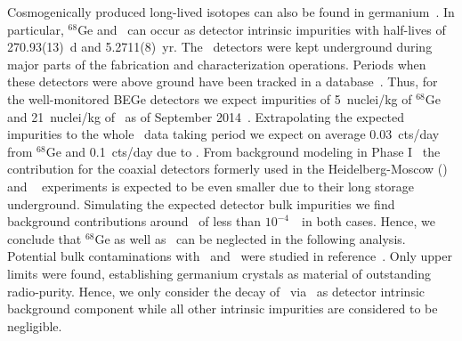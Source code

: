 Cosmogenically produced long-lived isotopes can also be found in
germanium~\cite{Meierhofer2009, Meierhofer2010, Meierhofer2012}. In particular, $^{68}$Ge
and \Co\ can occur as detector intrinsic impurities with half-lives of 270.93(13)~d and
5.2711(8)~yr.  The \bege\ detectors were kept underground during major parts of the
fabrication and characterization operations. Periods when these detectors were above
ground have been tracked in a database~\cite{Agostini2015e}.  Thus, for the well-monitored
BEGe detectors we expect impurities of 5~nuclei/kg of $^{68}$Ge and 21~nuclei/kg of \Co\
as of September 2014~\cite{Agostini2015e}. Extrapolating the expected impurities to the
whole \phasetwo\ data taking period we expect on average 0.03~cts/day from $^{68}$Ge and
0.1~cts/day due to \Co. From background modeling in Phase I~\cite{Agostini2013a} the
contribution for the coaxial detectors formerly used in the Heidelberg-Moscow
(\hdm)~\cite{Klapdor2001} and \igex~\cite{Aalseth2002} experiments is expected to be even
smaller due to their long storage underground. Simulating the expected detector bulk
impurities we find background contributions around \qbb\ of less than $10^{-4}$~\ctsper\
in both cases. Hence, we conclude that $^{68}$Ge as well as \Co\ can be neglected in the
following analysis. Potential bulk contaminations with \Uh\ and \Thh\ were studied in
reference~\cite{Agostini2016a}. Only upper limits were found, establishing germanium
crystals as material of outstanding radio-purity.  Hence, we only consider the decay of
\gesix\ via \nnbb\ as detector intrinsic background component while all other intrinsic
impurities are considered to be negligible.


